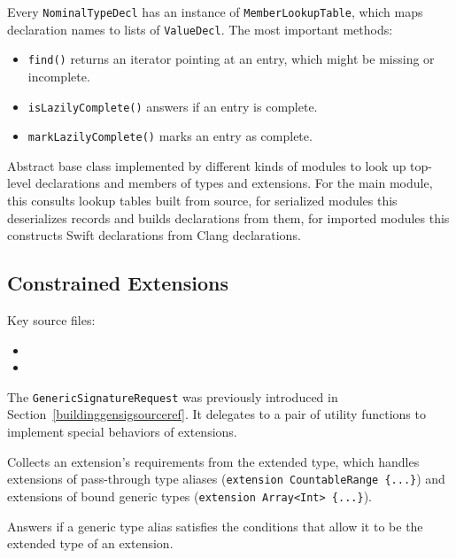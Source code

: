 \documentclass[../generics]{subfiles}
\begin{document}
Every \texttt{NominalTypeDecl} has an instance of \texttt{MemberLookupTable}, which maps declaration names to lists of \texttt{ValueDecl}. The most important methods:
\begin{itemize}
\item \texttt{find()} returns an iterator pointing at an entry, which might be missing or incomplete.
\item \texttt{isLazilyComplete()} answers if an entry is complete.
\item \texttt{markLazilyComplete()} marks an entry as complete.
\end{itemize}

Abstract base class implemented by different kinds of modules to look up top-level declarations and members of types and extensions. For the main module, this consults lookup tables built from source, for serialized modules this deserializes records and builds declarations from them, for imported modules this constructs Swift declarations from Clang declarations.

\subsection*{Constrained Extensions}

Key source files:
\begin{itemize}
\item {}
\item {}
\end{itemize}
The \texttt{GenericSignatureRequest} was previously introduced in Section~\ref{buildinggensigsourceref}. It delegates to a pair of utility functions to implement special behaviors of extensions.

Collects an extension's requirements from the extended type, which handles extensions of pass-through type aliases (\verb|extension CountableRange {...}|) and extensions of bound generic types (\verb|extension Array<Int> {...}|).

Answers if a generic type alias satisfies the conditions that allow it to be the extended type of an extension.
\end{document}
